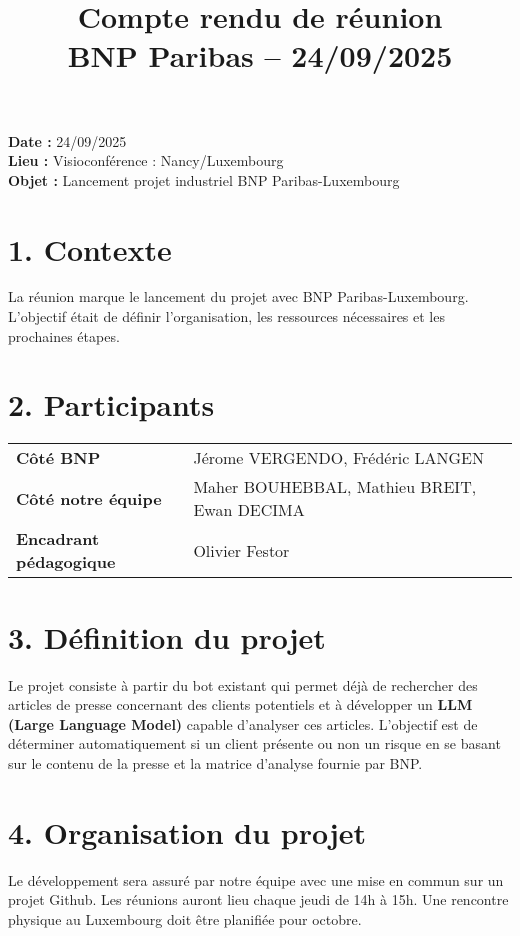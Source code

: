 \documentclass[a4paper,11pt]{article}
\title{\LARGE Compte rendu de réunion \\ \large BNP Paribas – 24/09/2025}
\date{}
\begin{document}
\maketitle

\begin{tcolorbox}[colback=blue!5!white,colframe=blue!75!black,title=Informations générales]
\textbf{Date :} 24/09/2025 \\
\textbf{Lieu :} Visioconférence : Nancy/Luxembourg \\
\textbf{Objet :} Lancement projet industriel BNP Paribas-Luxembourg
\end{tcolorbox}

\vspace{0.5cm}

\section*{1. Contexte}
La réunion marque le lancement du projet avec BNP Paribas-Luxembourg. L'objectif était de définir l'organisation, les ressources nécessaires et les prochaines étapes.

\section*{2. Participants}
\begin{tcolorbox}[colback=gray!5!white,colframe=black!75!black,title=Participants]
\begin{tabular}{>{\bfseries}l l}
Côté BNP & Jérome VERGENDO, Frédéric LANGEN \\
Côté notre équipe & Maher BOUHEBBAL, Mathieu BREIT, Ewan DECIMA \\
Encadrant pédagogique & Olivier Festor
\end{tabular}
\end{tcolorbox}

\section*{3. Définition du projet}
Le projet consiste à partir du bot existant qui permet déjà de rechercher des articles de presse concernant des clients potentiels et à développer un \textbf{LLM (Large Language Model)} capable d’analyser ces articles. L'objectif est de déterminer automatiquement si un client présente ou non un risque en se basant sur le contenu de la presse et la matrice d'analyse fournie par BNP.

\section*{4. Organisation du projet}
Le développement sera assuré par notre équipe avec une mise en commun sur un projet Github. Les réunions auront lieu chaque jeudi de 14h à 15h. Une rencontre physique au Luxembourg doit être planifiée pour octobre.
\end{document}
